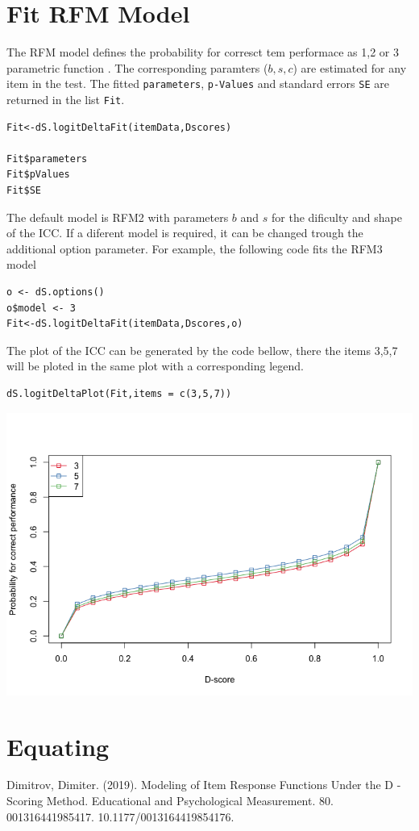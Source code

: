 \documentclass[10pt,a4paper]{article}
\begin{document}
\section{Fit RFM Model}
The RFM model defines the probability for corresct tem performace as 1,2 or 3 parametric function \cite{1}. The corresponding paramters ($b,s,c$) are estimated for any item in the test. The fitted {\tt parameters}, {\tt p-Values} and standard errors {\tt SE} are returned in the list {\tt Fit}.

\begin{lstlisting}
Fit<-dS.logitDeltaFit(itemData,Dscores)

Fit$parameters
Fit$pValues
Fit$SE
\end{lstlisting}

The default model is RFM2 with parameters $b$ and $s$ for the dificulty and shape of the ICC. If a diferent model is required, it can be changed trough the additional option parameter. For example, the following code fits the RFM3 model
\begin{lstlisting}
o <- dS.options()
o$model <- 3
Fit<-dS.logitDeltaFit(itemData,Dscores,o)
\end{lstlisting}

The plot of the ICC can be generated by the code bellow, there the items 3,5,7 will be ploted in the same plot with a corresponding legend.

\begin{lstlisting}
dS.logitDeltaPlot(Fit,items = c(3,5,7))
\end{lstlisting}

\includegraphics[scale=0.5]{icc.png}

\section{Equating}


\begin{thebibliography}{9}
 Dimitrov, Dimiter. (2019). Modeling of Item Response Functions Under the D -Scoring Method. Educational and Psychological Measurement. 80. 001316441985417. 10.1177/0013164419854176. 
\end{thebibliography}
\end{document}
